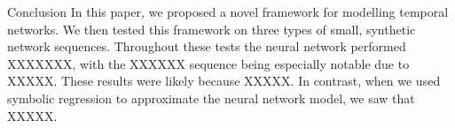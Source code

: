 \documentclass{article}
\begin{document}
\begin{section}{Conclusion}
    In this paper, we proposed a novel framework for modelling temporal networks. We then tested this framework on three types of small, synthetic network sequences. Throughout these tests the neural network performed XXXXXXX, with the XXXXXX sequence being especially notable due to XXXXX. These results were likely because XXXXX. In contrast, when we used symbolic regression to approximate the neural network model, we saw that XXXXX.
\end{section} 



\printbibliography
\end{document}

